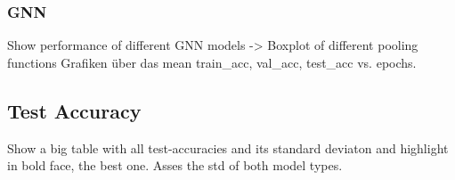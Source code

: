 \subsubsection{GNN}
Show performance of different GNN models -> Boxplot of different pooling functions
Grafiken über das mean train\_acc, val\_acc, test\_acc vs. epochs.

\subsection{Test Accuracy}
Show a big table with all test-accuracies and its standard deviaton and highlight in bold face, the best one.
Asses the std of both model types.

\begin{table}
\end{table}
